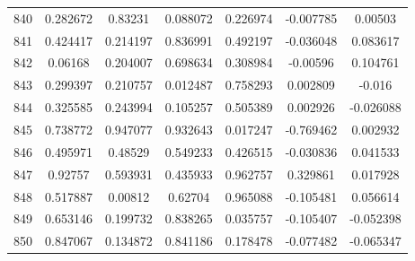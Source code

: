 \begin{table}
\begin{tabular}{c|c|c|c|c|c|c}
840 & 0.282672 & 0.83231 & 0.088072 & 0.226974 & -0.007785 & 0.00503\\
841 & 0.424417 & 0.214197 & 0.836991 & 0.492197 & -0.036048 & 0.083617\\
842 & 0.06168 & 0.204007 & 0.698634 & 0.308984 & -0.00596 & 0.104761\\
843 & 0.299397 & 0.210757 & 0.012487 & 0.758293 & 0.002809 & -0.016\\
844 & 0.325585 & 0.243994 & 0.105257 & 0.505389 & 0.002926 & -0.026088\\
845 & 0.738772 & 0.947077 & 0.932643 & 0.017247 & -0.769462 & 0.002932\\
846 & 0.495971 & 0.48529 & 0.549233 & 0.426515 & -0.030836 & 0.041533\\
847 & 0.92757 & 0.593931 & 0.435933 & 0.962757 & 0.329861 & 0.017928\\
848 & 0.517887 & 0.00812 & 0.62704 & 0.965088 & -0.105481 & 0.056614\\
849 & 0.653146 & 0.199732 & 0.838265 & 0.035757 & -0.105407 & -0.052398\\
850 & 0.847067 & 0.134872 & 0.841186 & 0.178478 & -0.077482 & -0.065347\\
\end{tabular}
\end{table}
\newpage
